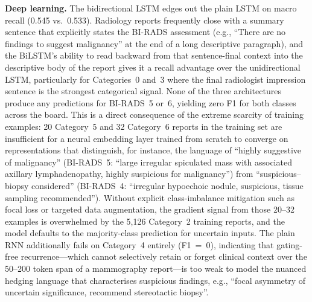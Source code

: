 \documentclass[11pt,a4paper]{article}
\begin{document}
\textbf{Deep learning.}
The bidirectional LSTM edges out the plain LSTM on macro recall (0.545
vs.~0.533).
Radiology reports frequently close with a summary sentence that explicitly
states the BI-RADS assessment (e.g., ``There are no findings to suggest
malignancy'' at the end of a long descriptive paragraph), and the BiLSTM's
ability to read backward from that sentence-final context into the descriptive
body of the report gives it a recall advantage over the unidirectional LSTM,
particularly for Categories~0 and~3 where the final radiologist impression
sentence is the strongest categorical signal.
None of the three architectures produce any predictions for BI-RADS~5 or~6,
yielding zero F1 for both classes across the board.
This is a direct consequence of the extreme scarcity of training examples:
20 Category~5 and 32 Category~6 reports in the training set are insufficient
for a neural embedding layer trained from scratch to converge on
representations that distinguish, for instance, the language of ``highly
suggestive of malignancy'' (BI-RADS~5: ``large irregular spiculated mass with
associated axillary lymphadenopathy, highly suspicious for malignancy'') from
``suspicious--biopsy considered'' (BI-RADS~4: ``irregular hypoechoic nodule,
suspicious, tissue sampling recommended'').
Without explicit class-imbalance mitigation such as focal loss or targeted data
augmentation, the gradient signal from those 20--32 examples is overwhelmed by
the 5{,}126 Category~2 training reports, and the model defaults to the
majority-class prediction for uncertain inputs.
The plain RNN additionally fails on Category~4 entirely (F1~=~0), indicating
that gating-free recurrence---which cannot selectively retain or forget
clinical context over the 50--200 token span of a mammography report---is too
weak to model the nuanced hedging language that characterises suspicious
findings, e.g., ``focal asymmetry of uncertain significance, recommend
stereotactic biopsy''.
\end{document}
